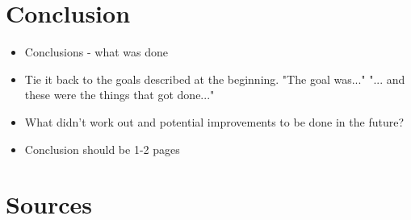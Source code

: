 \documentclass[a4paper, 12pt]{article} \linespread{1.3}
\begin{document}
\section{Conclusion}
\begin{itemize}
    \item Conclusions - what was done
    \item Tie it back to the goals described at the beginning. "The goal was..."
        "... and these were the things that got done..."
    \item What didn't work out and potential improvements to be done in the
        future?
    \item Conclusion should be 1-2 pages
\end{itemize}

\section{Sources}
\end{document}
